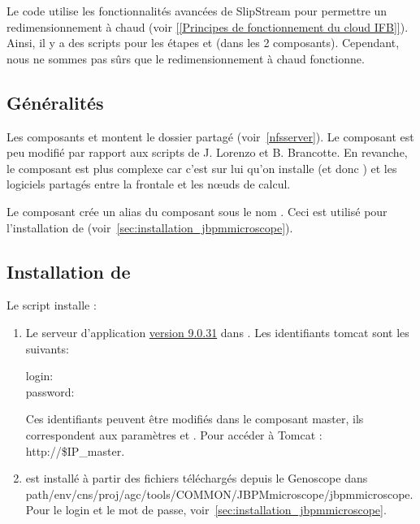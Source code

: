 Le code utilise les fonctionnalités avancées de SlipStream pour permettre un redimensionnement à chaud
(voir \href{https://intranet.genoscope.cns.fr/agc/redmine/projects/microcloud/wiki/Principes_de_fonctionnement_du_cloud_IFB}{[[Principes de fonctionnement du cloud IFB]]}).
Ainsi, il y a des scripts pour les étapes  et  (dans les 2 composants).
Cependant, nous ne sommes pas sûrs que le redimensionnement à chaud fonctionne.

\subsection{Généralités}

Les composants  et  montent le dossier partagé  (voir~\autoref{nfsserver}).
Le composant  est peu modifié par rapport aux scripts de J. Lorenzo et B. Brancotte.
En revanche, le composant  est plus complexe car
c'est sur lui qu'on installe  (et donc )
et les logiciels partagés entre la frontale et les nœuds de calcul.

Le composant  crée un alias du composant  sous le nom .
Ceci est utilisé pour l'installation de  (voir~\autoref{sec:installation_jbpmmicroscope}).

\subsection{Installation de }

Le script  installe :
\begin{enumerate}
    \item Le serveur d'application \href{http://mirrors.ircam.fr/pub/apache/tomcat/tomcat-9/v9.0.31/bin/apache-tomcat-9.0.31.tar.gz}{ version 9.0.31} dans .
    Les identifiants tomcat sont les suivants:
    \begin{description}
        \item[login:] 
        \item[password:] 
    \end{description}
    Ces identifiants peuvent être modifiés dans le composant master, ils correspondent aux paramètres  et .
    Pour accéder à Tomcat : http://\$IP\_master.

    \item {} est installé à partir des fichiers téléchargés depuis le Genoscope
    dans path{/env/cns/proj/agc/tools/COMMON/JBPMmicroscope/jbpmmicroscope}.
    Pour le login et le mot de passe, voir~\autoref{sec:installation_jbpmmicroscope}.
\end{enumerate}

